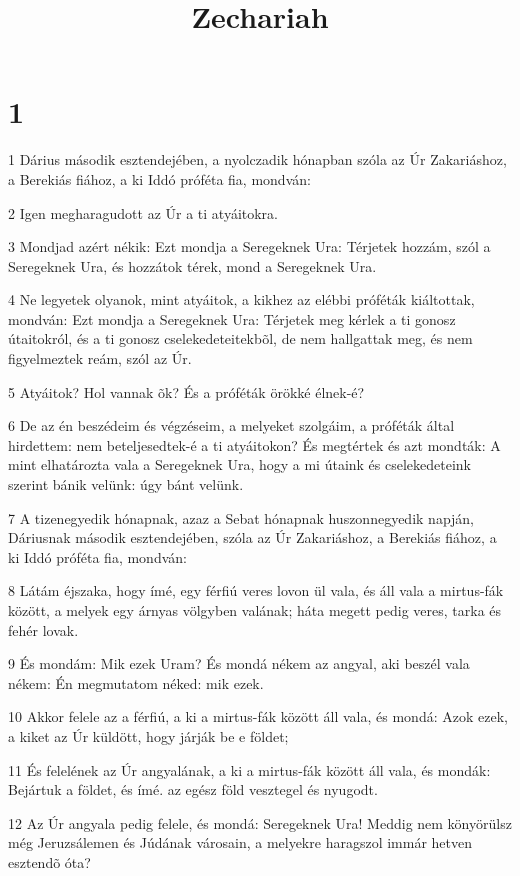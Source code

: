

\title{Zechariah}


\chapter{1}

\par 1 Dárius második esztendejében, a nyolczadik hónapban szóla az Úr Zakariáshoz, a Berekiás fiához, a ki Iddó próféta fia, mondván:
\par 2 Igen megharagudott az Úr a ti atyáitokra.
\par 3 Mondjad azért nékik: Ezt mondja a Seregeknek Ura: Térjetek hozzám, szól a Seregeknek Ura, és hozzátok térek, mond a Seregeknek Ura.
\par 4 Ne legyetek olyanok, mint atyáitok, a kikhez az elébbi próféták kiáltottak, mondván: Ezt mondja a Seregeknek Ura: Térjetek meg kérlek a ti gonosz útaitokról, és a ti gonosz cselekedeteitekbõl, de nem hallgattak meg, és nem figyelmeztek reám, szól az Úr.
\par 5 Atyáitok? Hol vannak õk? És a próféták örökké élnek-é?
\par 6 De az én beszédeim és végzéseim, a melyeket szolgáim, a próféták által hirdettem: nem beteljesedtek-é a ti atyáitokon? És megtértek és azt mondták: A mint elhatározta vala a Seregeknek Ura, hogy a mi útaink és cselekedeteink szerint bánik velünk: úgy bánt velünk.
\par 7 A tizenegyedik hónapnak, azaz a Sebat hónapnak huszonnegyedik napján, Dáriusnak második esztendejében, szóla az Úr Zakariáshoz, a Berekiás fiához, a ki Iddó próféta fia, mondván:
\par 8 Látám éjszaka, hogy ímé, egy férfiú veres lovon ül vala, és áll vala a mirtus-fák között, a melyek egy árnyas völgyben valának; háta megett pedig veres, tarka és fehér lovak.
\par 9 És mondám: Mik ezek Uram? És mondá nékem az angyal, aki beszél vala nékem: Én megmutatom néked: mik ezek.
\par 10 Akkor felele az a férfiú, a ki a mirtus-fák között áll vala, és mondá: Azok ezek, a kiket az Úr küldött, hogy járják be e földet;
\par 11 És felelének az Úr angyalának, a ki a mirtus-fák között áll vala, és mondák: Bejártuk a földet, és ímé. az egész föld vesztegel és nyugodt.
\par 12 Az Úr angyala pedig felele, és mondá: Seregeknek Ura! Meddig nem könyörülsz még Jeruzsálemen és Júdának városain, a melyekre haragszol immár hetven esztendõ óta?
